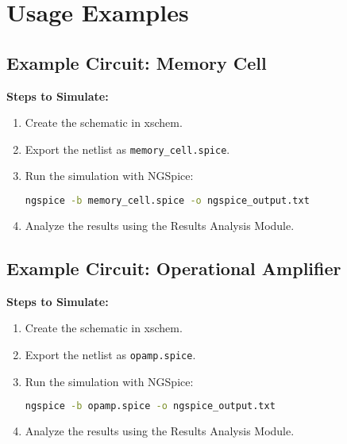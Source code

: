\documentclass[12pt]{article}
\begin{document}
\section{Usage Examples}
\subsection{Example Circuit: Memory Cell}
\begin{figure}[htbp]
\end{figure}

\textbf{Steps to Simulate:}
\begin{enumerate}
    \item Create the schematic in xschem.
    \item Export the netlist as \texttt{memory\_cell.spice}.
    \item Run the simulation with NGSpice:
    \begin{lstlisting}[language=bash, breaklines=true]
    ngspice -b memory_cell.spice -o ngspice_output.txt
    \end{lstlisting}
    \item Analyze the results using the Results Analysis Module.
\end{enumerate}

\subsection{Example Circuit: Operational Amplifier}
\begin{figure}[htbp]
\end{figure}

\textbf{Steps to Simulate:}
\begin{enumerate}
    \item Create the schematic in xschem.
    \item Export the netlist as \texttt{opamp.spice}.
    \item Run the simulation with NGSpice:
    \begin{lstlisting}[language=bash, breaklines=true]
    ngspice -b opamp.spice -o ngspice_output.txt
    \end{lstlisting}
    \item Analyze the results using the Results Analysis Module.
\end{enumerate}
\end{document}
